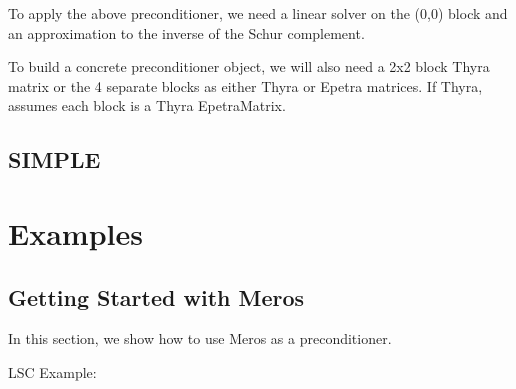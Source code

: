 \documentclass[oneeqnum,onefignum,onetabnum,10pt]{SANDreport}
\begin{document}
To apply the above preconditioner, we need a linear solver on the
(0,0) block and an approximation to the inverse of the Schur
complement.

To build a concrete preconditioner object, we will also need a 2x2
block Thyra matrix or the 4 separate blocks as either Thyra or Epetra
matrices.  If Thyra, assumes each block is a Thyra EpetraMatrix.




\subsection{SIMPLE}

\section{Examples}

\subsection{Getting Started with Meros}
In this section, we show how to use Meros as a preconditioner.

LSC Example:
\end{document}
